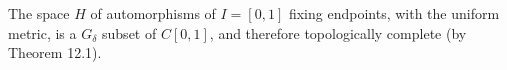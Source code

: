 The space $H$ of automorphisms of $I = [0,1]$ fixing endpoints, with the uniform metric, is a $G_\delta$ subset of $C[0,1]$, and therefore topologically complete (by Theorem 12.1).
